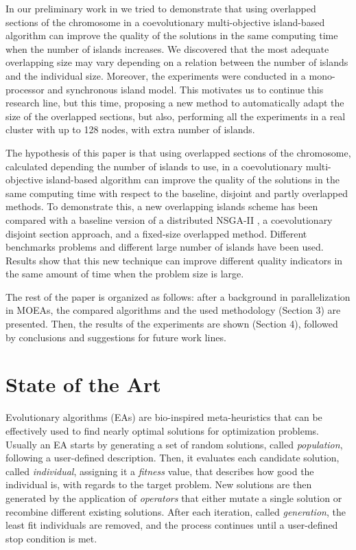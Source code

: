 \documentclass[Afour,sageh,times]{sagej}
\begin{document}
In our preliminary work in \citep{Garcia16hpmoon} we tried to demonstrate that using overlapped sections of the chromosome in a coevolutionary multi-objective island-based algorithm can improve the quality of the solutions in the same computing time when the number of islands increases. We discovered that the most adequate overlapping size may vary depending on a relation between the number of islands and the individual size. Moreover, the experiments were conducted in a mono-processor and synchronous island model. This motivates us to continue this research line, but this time, proposing a new method to automatically adapt the size of the overlapped sections, but also, performing all the experiments in a real cluster with up to 128 nodes, with extra number of islands.


The hypothesis of this paper is that using overlapped sections of the chromosome, calculated depending the number of islands to use, in a coevolutionary multi-objective island-based algorithm can improve the quality of the solutions in the same computing time with respect to the baseline, disjoint and partly overlapped methods. To demonstrate this, a new overlapping islands scheme has been compared with a baseline version of a distributed NSGA-II \citep{Deb00NSGAII}, a coevolutionary disjoint section approach, and a fixed-size overlapped method. Different benchmarks problems and different large number of islands have been used. Results show that this new technique can improve different quality indicators in the same amount of time when the problem size is large. 

The rest of the paper is organized as follows: after a background in parallelization in MOEAs, 
the compared algorithms and the used methodology (Section 3) are presented. %
Then, the results of the experiments are shown (Section 4), followed by conclusions and suggestions for future work lines.


%
\section{State of the Art}
\label{sec:soa}

Evolutionary algorithms (EAs) \citep{DBLP:series/ncs/EibenS15,DeJong2006} are bio-inspired meta-heuristics that can be effectively used to find nearly optimal solutions for optimization problems. Usually an EA starts by generating a set of random solutions, called \emph{population}, following a user-defined description. Then, it evaluates each candidate solution, called \emph{individual}, assigning it a \emph{fitness} value, that describes how good the individual is, with regards to the target problem. New solutions are then generated by the application of \emph{operators} that either mutate a single solution or recombine different existing solutions. After each iteration, called \emph{generation}, the least fit individuals are removed, and the process continues until a user-defined stop condition is met.
\end{document}
